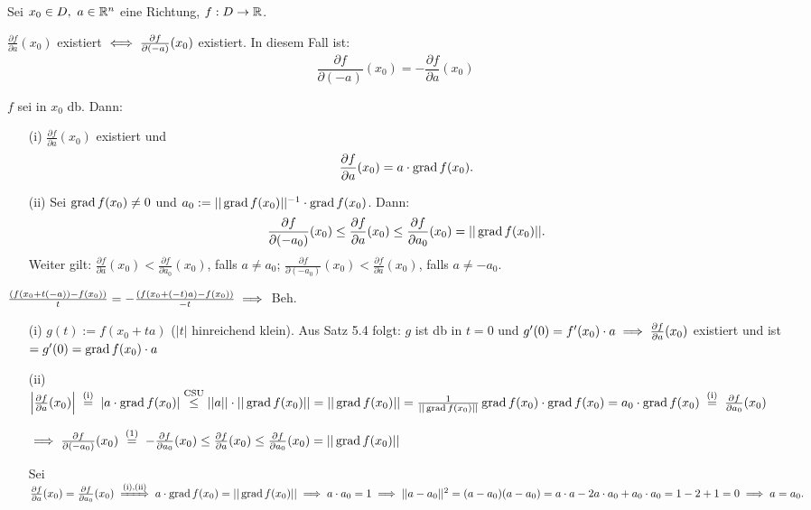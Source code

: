 \documentclass[a4paper,twoside,DIV15,BCOR12mm]{scrbook}
\begin{document}
\begin{satz}[Richtungsableitungen]
Sei $x_0 \in D,\ a \in \mathbb{R}^n$ eine Richtung, $f:D \to \mathbb{R}$.
\begin{liste}
\item $\frac{\partial f}{\partial a}(x_0)$ existiert $\iff \frac{\partial f}{\partial (-a)}(x_0)$ existiert. In diesem Fall ist: $$\frac{\partial f}{\partial (-a)}(x_0) = -\frac{\partial f}{\partial a}(x_0)$$
\item $f$ sei in $x_0$ db. Dann:
\begin{enumerate}
\item[(i)] $\frac{\partial f}{\partial a}(x_0)$ existiert und $$\frac{\partial f}{\partial a}(x_0) = a\cdot \mathop{\rm grad}\nolimits f(x_0).$$
\item[(ii)] Sei $\mathop{\rm grad}\nolimits f(x_0) \ne 0$ und $a_0 := ||\mathop{\rm grad}\nolimits f(x_0)||^{-1}\cdot \mathop{\rm grad}\nolimits f(x_0)$. Dann: $$\frac{\partial f}{\partial (-a_0)}(x_0) \le \frac{\partial f}{\partial a}(x_0) \le \frac{\partial f}{\partial a_0}(x_0) = ||\mathop{\rm grad}\nolimits f(x_0)||.$$ Weiter gilt: $\frac{\partial f}{\partial a}(x_0) < \frac{\partial f}{\partial a_0}(x_0)$, falls $a \ne a_0$; $\frac{\partial f}{\partial (-a_0)}(x_0) < \frac{\partial f}{\partial a}(x_0)$, falls $a \ne -a_0$.
\end{enumerate}
\end{liste}
\end{satz}

\begin{beweis}
\begin{liste}
\item $\frac{(f(x_0+t(-a))-f(x_0))}{t} = -\frac{(f(x_0+(-t)a)-f(x_0))}{-t} \implies$ Beh.
\item \begin{enumerate}
\item[(i)] $g(t) := f(x_0+ta)$ ($|t|$ hinreichend klein). Aus Satz 5.4 folgt: $g$ ist db in $t=0$ und $g'(0) = f'(x_0) \cdot a \implies \frac{\partial f}{\partial a}(x_0)$ existiert und ist $= g'(0) = \mathop{\rm grad}\nolimits f(x_0)\cdot a$
\item[(ii)] $\left| \frac{\partial f}{\partial a}(x_0) \right| \gleichnach{(i)} |a\cdot \grad f(x_0)| \overset{\text{CSU}}{\le} ||a||\cdot ||\grad f(x_0)|| = ||\grad f(x_0)|| = \frac{1}{||\grad f(x_0)||} \grad f(x_0) \cdot \grad f(x_0) = a_0\cdot \grad f(x_0) \gleichnach{(i)} \frac{\partial f}{\partial a_0}(x_0)$

$\folgt \frac{\partial f}{\partial (-a_0)}(x_0) \gleichnach{(1)} -\frac{\partial f}{\partial a_0}(x_0) \le \frac{\partial f}{\partial a}(x_0) \le \frac{\partial f}{\partial a_0}(x_0) = ||\grad f(x_0)||$

Sei $\frac{\partial f}{\partial a}(x_0) = \frac{\partial f}{\partial a_0}(x_0) \folgtnach{(i),(ii)} a\cdot\grad f(x_0) = ||\grad f(x_0)|| \folgt a\cdot a_0 = 1 \folgt ||a-a_0||^2 = (a-a_0)(a-a_0) = a\cdot a - 2a\cdot a_0 + a_0\cdot a_0 = 1-2+1 = 0 \folgt a=a_0.$
\end{enumerate}
\end{liste}
\end{beweis}
\end{document}
